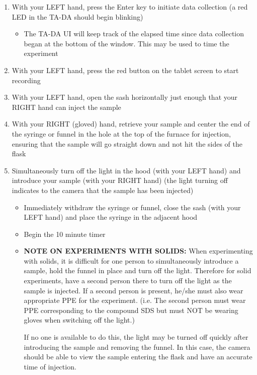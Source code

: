 \documentclass[letterpaper,11pt]{article}
\begin{document}
\begin{enumerate}
    \item With your LEFT hand, press the Enter key to 
        initiate data collection (a red LED in the TA-DA should begin blinking)
        \begin{itemize}
        \item The TA-DA UI will keep track of the elapsed time since data 
            collection began at the bottom of the window. This may be used
            to time the experiment
        \end{itemize}
    \item With your LEFT hand, press the red button on the tablet screen to 
        start recording
    \item With your LEFT hand, open the sash horizontally just enough that your
        RIGHT hand can inject the sample
    \item With your RIGHT (gloved) hand, retrieve your sample and center the 
        end of the syringe or funnel in the hole at the top of the furnace for 
        injection, ensuring that the sample will go straight down and not hit 
        the sides of the flask
    \item Simultaneously turn off the light in the hood (with your LEFT hand) 
        and introduce your sample (with your RIGHT hand) (the light turning off 
        indicates to the camera that the sample has been injected)
        \begin{itemize}
        \item Immediately withdraw the syringe or funnel, close the sash (with 
            your LEFT hand) and place the syringe in the adjacent hood
        \item Begin the 10 minute timer
        \item \textbf{NOTE ON EXPERIMENTS WITH SOLIDS:} When experimenting with 
            solids, it is difficult for one person to simultaneously introduce a 
            sample, hold the funnel in place and turn off the light. Therefore 
            for solid experiments, have a second person there to turn off the 
            light as the sample is injected. If a second person is present, 
            he/she must also wear appropriate PPE for the experiment. (i.e. The
            second person must wear PPE corresponding to the compound SDS but 
            must NOT be wearing gloves when switching off the light.)

            If no one is available to do this, the light may be turned off 
            quickly after introducing the sample and removing the funnel. In 
            this case, the camera should be able to view the sample entering the
            flask and have an accurate time of injection.
        \end{itemize}    
            

\end{enumerate}
\end{document}
